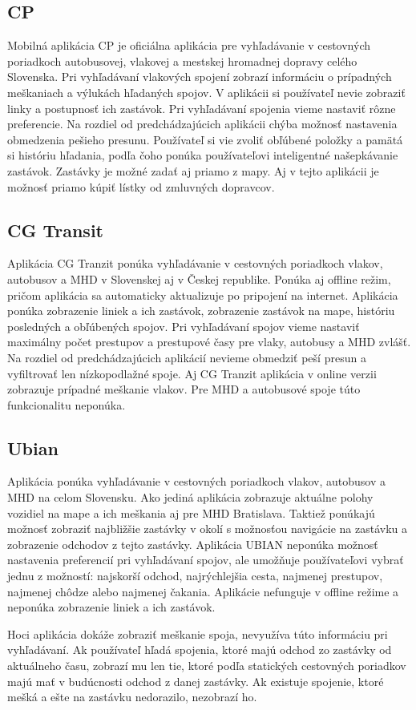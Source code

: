 \subsection{CP}
Mobilná aplikácia CP je oficiálna aplikácia pre vyhľadávanie v cestovných poriadkoch autobusovej, vlakovej a mestskej hromadnej dopravy celého Slovenska.  Pri vyhľadávaní vlakových spojení zobrazí informáciu o prípadných meškaniach a výlukách hľadaných spojov. V aplikácii si používateľ nevie zobraziť linky a postupnosť ich zastávok. Pri vyhľadávaní spojenia vieme nastaviť rôzne preferencie. Na rozdiel od predchádzajúcich aplikácii chýba možnosť nastavenia obmedzenia pešieho presunu. Používateľ si vie zvoliť obľúbené položky a pamätá si históriu hľadania, podľa čoho ponúka používateľovi inteligentné našepkávanie zastávok. Zastávky je možné zadať aj priamo z mapy. Aj v tejto aplikácii je možnosť priamo kúpiť lístky od zmluvných dopravcov.

\subsection{CG Transit}
Aplikácia CG Tranzit ponúka vyhľadávanie v cestovných poriadkoch vlakov, autobusov a MHD v Slovenskej aj v Českej republike. Ponúka aj offline režim, pričom aplikácia sa automaticky aktualizuje po pripojení na internet. Aplikácia ponúka zobrazenie liniek a ich zastávok, zobrazenie zastávok na mape, históriu posledných a obľúbených spojov. Pri vyhľadávaní spojov vieme nastaviť maximálny počet prestupov a prestupové časy pre vlaky, autobusy a MHD zvlášť. Na rozdiel od predchádzajúcich aplikácií nevieme obmedziť peší presun a vyfiltrovať len nízkopodlažné spoje. Aj CG Tranzit aplikácia v online verzii zobrazuje prípadné meškanie vlakov. Pre MHD a autobusové spoje túto funkcionalitu neponúka.

\subsection{Ubian}
Aplikácia ponúka vyhľadávanie v cestovných poriadkoch vlakov, autobusov a MHD na celom Slovensku. Ako jediná aplikácia zobrazuje aktuálne polohy vozidiel na mape a ich meškania aj pre MHD Bratislava. Taktiež ponúkajú možnosť zobraziť najbližšie zastávky v okolí s možnosťou navigácie na zastávku a zobrazenie odchodov z tejto zastávky. Aplikácia UBIAN neponúka možnosť nastavenia preferencií pri vyhľadávaní spojov, ale umožňuje používateľovi vybrať jednu z možností: najskorší odchod, najrýchlejšia cesta, najmenej prestupov, najmenej chôdze alebo najmenej čakania. Aplikácie nefunguje v offline režime a neponúka zobrazenie liniek a ich zastávok.

Hoci aplikácia dokáže zobraziť meškanie spoja, nevyužíva túto informáciu pri vyhľadávaní. Ak používateľ hľadá spojenia, ktoré majú odchod zo zastávky od aktuálneho času, zobrazí mu len tie, ktoré podľa statických cestovných poriadkov majú mať v budúcnosti odchod z danej zastávky. Ak existuje spojenie, ktoré mešká a ešte na zastávku nedorazilo, nezobrazí ho.



